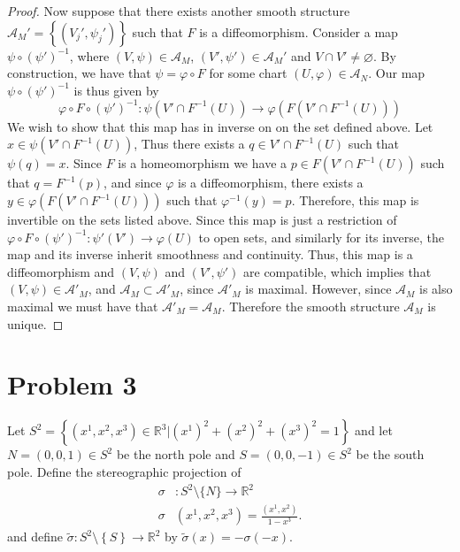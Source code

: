 \documentclass[a4paper]{article}
\begin{document}
\begin{proof}
  Now suppose that there exists another smooth structure $\mathcal{A}_M' = \left\{ (V_j', \psi_j') \right\}$ such that $F$ is a diffeomorphism. Consider a map $\psi \circ (\psi')^{-1}$, where $(V, \psi) \in \mathcal{A}_M$, $(V',\psi') \in \mathcal{A}_M'$ and $V \cap V' \neq \varnothing$. By construction, we have that $\psi = \varphi \circ F$ for some chart $(U, \varphi) \in \mathcal{A}_N$. Our map $\psi \circ (\psi')^{-1}$ is thus given by
  \[
    \varphi \circ F \circ (\psi')^{-1}: \psi(V' \cap F^{-1}(U)) \rightarrow \varphi(F(V' \cap F^{-1}(U)))
  \]
  We wish to show that this map has in inverse on on the set defined above. Let $x \in \psi(V' \cap F^{-1}(U))$, Thus there exists a $q \in V' \cap F^{-1}(U)$ such that $\psi(q) = x$. Since $F$ is a homeomorphism we have a $p \in F(V' \cap F^{-1}(U))$ such that $q = F^{-1}(p)$, and since $\varphi$ is a diffeomorphism, there exists a $y \in \varphi(F(V'\cap F^{-1}(U)))$ such that $\varphi^{-1}(y) = p$. Therefore, this map is invertible on the sets listed above. Since this map is just a restriction of $\varphi \circ F \circ (\psi')^{-1}: \psi'(V') \rightarrow \varphi(U)$ to open sets, and similarly for its inverse, the map and its inverse inherit smoothness and continuity. Thus, this map is a diffeomorphism and $(V, \psi)$ and $(V', \psi')$ are compatible, which implies that $(V, \psi) \in \mathcal{A}'_M$, and $\mathcal{A}_M \subset \mathcal{A}'_M$, since $\mathcal{A}'_M$ is maximal. However, since $\mathcal{A}_M$ is also maximal we must have that $\mathcal{A}'_M = \mathcal{A}_M$. Therefore the smooth structure $\mathcal{A}_M$ is unique.


\end{proof}

\section*{Problem 3}%
\label{sec:Problem 3}
Let $S^2 = \left\{ (x^1, x^2, x^3) \in \mathds{R}^3 | (x^1)^2 + (x^2)^2 + (x^3)^2 = 1 \right\}$ and let $N = (0,0,1) \in S^2$ be the north pole and $S = (0,0,-1) \in S^2$ be the south pole. Define the stereographic projection of 
\[
  \begin{aligned}
    \sigma&: S^2 \setminus \{N\} \rightarrow \mathds{R}^2 \\
    \sigma&(x^1, x^2, x^3) = \frac{(x^1, x^2)}{1 - x^3}.
  \end{aligned}
\]
and define $\tilde{\sigma}: S^2 \setminus \left\{ S \right\} \rightarrow \mathds{R}^2$ by $\tilde{\sigma}(x) = -\sigma(-x)$.
\end{document}
